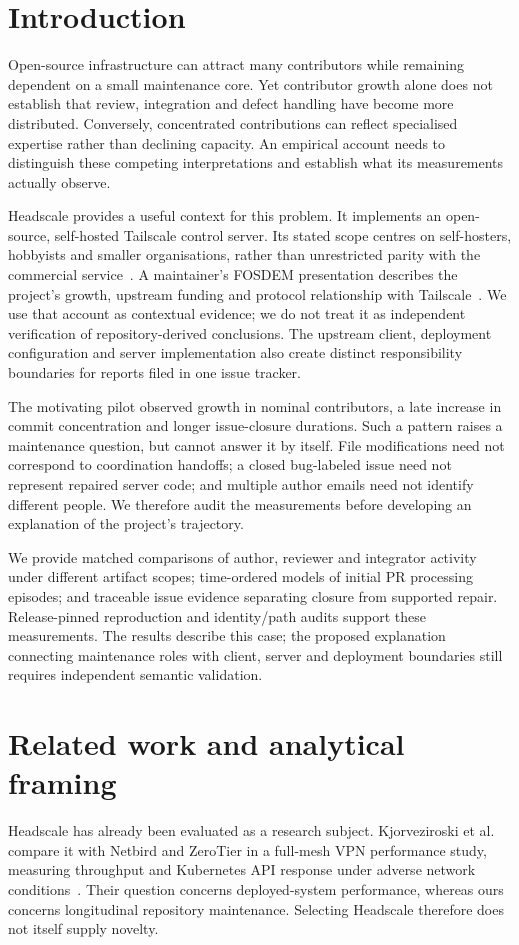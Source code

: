 \documentclass[11pt]{article}
\begin{document}
\section{Introduction}
Open-source infrastructure can attract many contributors while remaining dependent
on a small maintenance core. Yet contributor growth alone does not establish
that review, integration and defect handling have become more distributed.
Conversely, concentrated contributions can reflect specialised expertise rather
than declining capacity. An empirical account needs to distinguish these competing
interpretations and establish what its measurements actually observe.

Headscale provides a useful context for this problem. It implements an open-source,
self-hosted Tailscale control server. Its stated scope centres on self-hosters,
hobbyists and smaller organisations, rather than unrestricted parity with the
commercial service~\cite{headscale_design}. A maintainer's FOSDEM presentation
describes the project's growth, upstream funding and protocol relationship
with Tailscale~\cite{dalby2026fosdem}. We use that account as contextual evidence;
we do not treat it as independent verification of repository-derived conclusions.
The upstream client, deployment configuration and server implementation also
create distinct responsibility boundaries for reports filed in one issue tracker.

The motivating pilot observed growth in nominal contributors, a late increase
in commit concentration and longer issue-closure durations. Such a pattern raises
a maintenance question, but cannot answer it by itself. File modifications need
not correspond to coordination handoffs; a closed bug-labeled issue need not
represent repaired server code; and multiple author emails need not identify
different people. We therefore audit the measurements before developing an
explanation of the project's trajectory.

We provide matched comparisons of author, reviewer and integrator activity under
different artifact scopes; time-ordered models of initial PR processing episodes;
and traceable issue evidence separating closure from supported repair.
Release-pinned reproduction and identity/path audits support these measurements.
The results describe this case; the proposed explanation connecting maintenance
roles with client, server and deployment boundaries still requires independent
semantic validation.

\section{Related work and analytical framing}
Headscale has already been evaluated as a research subject.
Kjorveziroski et al. compare it with Netbird and ZeroTier in a full-mesh VPN
performance study, measuring throughput and Kubernetes API response under
adverse network conditions~\cite{kjorveziroski2024mesh}. Their question concerns
deployed-system performance, whereas ours concerns longitudinal repository
maintenance. Selecting Headscale therefore does not itself supply novelty.
\end{document}

